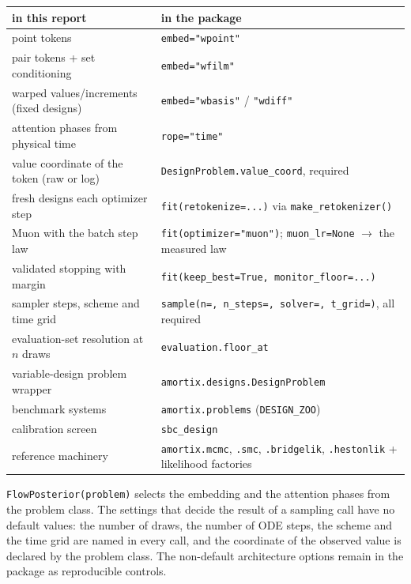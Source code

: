 \documentclass[10pt]{article}
\begin{document}
\begin{center}
\small
\begin{tabular}{@{}ll@{}}
\toprule
in this report & in the package \\
\midrule
point tokens & \texttt{embed="wpoint"} \\
pair tokens + set conditioning & \texttt{embed="wfilm"} \\
warped values/increments (fixed designs) & \texttt{embed="wbasis"} / \texttt{"wdiff"} \\
attention phases from physical time & \texttt{rope="time"} \\
value coordinate of the token (raw or log) & \texttt{DesignProblem.value\_coord}, required \\
fresh designs each optimizer step & \texttt{fit(retokenize=...)} via \texttt{make\_retokenizer()} \\
Muon with the batch step law & \texttt{fit(optimizer="muon")}; \texttt{muon\_lr=None} $\to$ the measured law \\
validated stopping with margin & \texttt{fit(keep\_best=True, monitor\_floor=...)} \\
sampler steps, scheme and time grid & \texttt{sample(n=, n\_steps=, solver=, t\_grid=)}, all required \\
evaluation-set resolution at $n$ draws & \texttt{evaluation.floor\_at} \\
variable-design problem wrapper & \texttt{amortix.designs.DesignProblem} \\
benchmark systems & \texttt{amortix.problems} (\texttt{DESIGN\_ZOO}) \\
calibration screen & \texttt{sbc\_design} \\
reference machinery & \texttt{amortix.mcmc}, \texttt{.smc}, \texttt{.bridgelik}, \texttt{.hestonlik} + likelihood factories \\
\bottomrule
\end{tabular}
\end{center}

\texttt{FlowPosterior(problem)} selects the embedding and the attention phases from the problem class.
The settings that decide the result of a sampling call have no default values: the number of draws,
the number of ODE steps, the scheme and the time grid are named in every call, and the coordinate of
the observed value is declared by the problem class. The non-default architecture options remain in
the package as reproducible controls.
\end{document}
